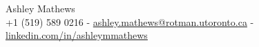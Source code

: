 
\begin{center}
    {\huge Ashley Mathews} \\ \vspace{2pt} 
    {+1 (519) 589 0216}
    \small{-}
    \href{mailto:[ashley.mathews@rotman.utoronto.ca]}{ashley.mathews@rotman.utoronto.ca}
    \small{-}
    \href{https://www.linkedin.com/in/ashleymmathews}{linkedin.com/in/ashleymmathews}
    \vspace{-7pt}
\end{center}
